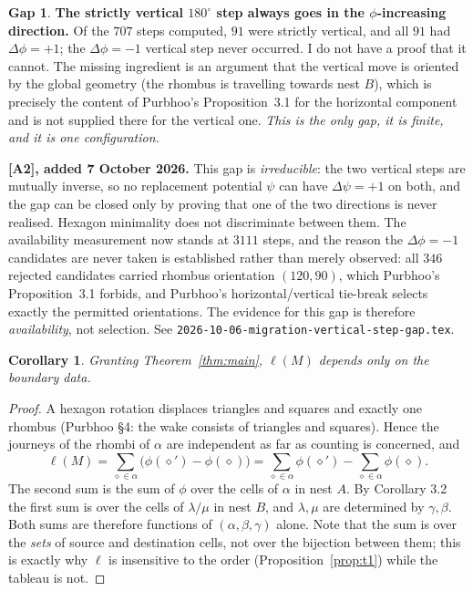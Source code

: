 \documentclass[11pt]{article}
\theoremstyle{plain}
\newtheorem{corollary}[theorem]{Corollary}
\theoremstyle{definition}
\newtheorem{gap}[theorem]{Gap}
\begin{document}
\begin{gap}\label{gap:vert}
\textbf{The strictly vertical $180^\circ$ step always goes in the $\phi$-increasing
direction.}  Of the $707$ steps computed, $91$ were strictly vertical, and all $91$
had $\Delta\phi=+1$; the $\Delta\phi=-1$ vertical step never occurred.  I do not have
a proof that it cannot.  The missing ingredient is an argument that the vertical
move is oriented by the global geometry (the rhombus is travelling towards nest $B$),
which is precisely the content of Purbhoo's Proposition~3.1 for the horizontal
component and is not supplied there for the vertical one.  \emph{This is the only
gap, it is finite, and it is one configuration.}

\textbf{[A2], added 7 October 2026.}  This gap is \emph{irreducible}: the two
vertical steps are mutually inverse, so no replacement potential $\psi$ can have
$\Delta\psi=+1$ on both, and the gap can be closed only by proving that one of the
two directions is never realised.  Hexagon minimality does not discriminate between
them.  The availability measurement now stands at $3111$ steps, and the reason the
$\Delta\phi=-1$ candidates are never taken is established rather than merely
observed: all $346$ rejected candidates carried rhombus orientation $(120,90)$, which
Purbhoo's Proposition~3.1 forbids, and Purbhoo's horizontal/vertical tie-break
selects exactly the permitted orientations.  The evidence for this gap is therefore
\emph{availability}, not selection.  See
\texttt{2026-10-06-migration-vertical-step-gap.tex}.
\end{gap}

\begin{corollary}\label{cor:boundary}
Granting Theorem~\ref{thm:main}, $\ell(M)$ depends only on the boundary data.
\end{corollary}
\begin{proof}
A hexagon rotation displaces triangles and squares and exactly one rhombus
(Purbhoo \S4: the wake consists of triangles and squares).  Hence the journeys of the
rhombi of $\alpha$ are independent as far as counting is concerned, and
\[
 \ell(M)=\sum_{\diamond\in\alpha}\bigl(\phi(\diamond')-\phi(\diamond)\bigr)
        =\sum_{\diamond\in\alpha}\phi(\diamond')-\sum_{\diamond\in\alpha}\phi(\diamond).
\]
The second sum is the sum of $\phi$ over the cells of $\alpha$ in nest $A$.  By
Corollary 3.2 the first sum is over the cells of $\lambda/\mu$ in nest $B$, and
$\lambda,\mu$ are determined by $\gamma,\beta$.  Both sums are therefore functions of
$(\alpha,\beta,\gamma)$ alone.  Note that the sum is over the \emph{sets} of source
and destination cells, not over the bijection between them; this is exactly why
$\ell$ is insensitive to the order (Proposition~\ref{prop:t1}) while the tableau is
not.
\end{proof}
\end{document}
